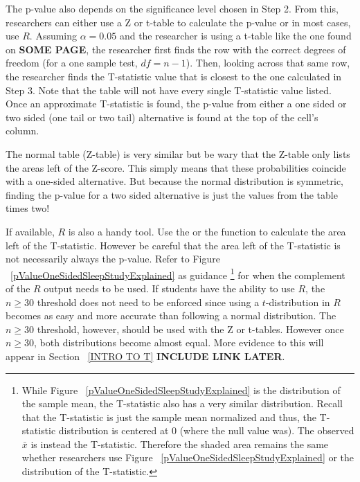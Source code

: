 The p-value also depends on the significance level chosen in Step 2. From this, researchers can either use a Z or t-table to calculate the p-value or in most cases, use $R$. Assuming $\alpha = 0.05$ and the researcher is using a t-table like the one found on \textbf{SOME PAGE}, the researcher first finds the row with the correct degrees of freedom (for a one sample test, $df = n-1$). Then, looking across that same row, the researcher finds the T-statistic value that is closest to the one calculated in Step 3. Note that the table will not have every single T-statistic value listed. Once an approximate T-statistic is found, the p-value from either a one sided or two sided (one tail or two tail) alternative is found at the top of the cell's column.
 
The normal table (Z-table) is very similar but be wary that the Z-table only lists the areas left of the Z-score. This simply means that these probabilities coincide with a one-sided alternative. But because the normal distribution is symmetric, finding the p-value for a two sided alternative is just the values from the table times two! 

If available, $R$ is also a handy tool. Use the  or the  function to calculate the area left of the T-statistic. However be careful that the area left of the T-statistic is not necessarily always the p-value. Refer to Figure ~\ref{pValueOneSidedSleepStudyExplained} as guidance \footnote{While Figure ~\ref{pValueOneSidedSleepStudyExplained} is the distribution of the sample mean, the T-statistic also has a very similar distribution. Recall that the T-statistic is just the sample mean normalized and thus, the T-statistic distribution is centered at 0 (where the null value was). The observed $\bar{x}$ is instead the T-statistic. Therefore the shaded area remains the same whether researchers use Figure ~\ref{pValueOneSidedSleepStudyExplained} or the distribution of the T-statistic.} for when the complement of the $R$ output needs to be used. If students have the ability to use $R$, the $n\geq 30$ threshold does not need to be enforced since using a $t$-distribution in $R$ becomes as easy and more accurate than following a normal distribution. The $n\geq 30$ threshold, however, should be used with the Z or t-tables. However once $n\geq 30$, both distributions become almost equal. More evidence to this will appear in Section ~\ref{INTRO TO T} \textbf{INCLUDE LINK LATER}.  


